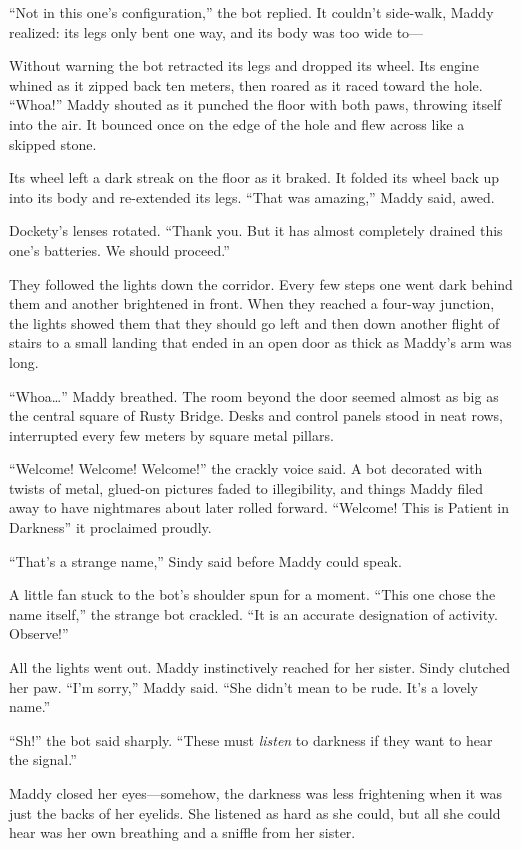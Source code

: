 \documentclass[10pt]{article}
\begin{document}
``Not in this one's configuration,'' the bot replied. It couldn't
side-walk, Maddy realized: its legs only bent one way, and its body was
too wide to---

Without warning the bot retracted its legs and dropped its wheel. Its
engine whined as it zipped back ten meters, then roared as it raced
toward the hole. ``Whoa!'' Maddy shouted as it punched the floor with
both paws, throwing itself into the air. It bounced once on the edge of
the hole and flew across like a skipped stone.

Its wheel left a dark streak on the floor as it braked. It folded its
wheel back up into its body and re-extended its legs. ``That was
amazing,'' Maddy said, awed.

Dockety's lenses rotated. ``Thank you. But it has almost completely
drained this one's batteries. We should proceed.''

They followed the lights down the corridor. Every few steps one went
dark behind them and another brightened in front. When they reached a
four-way junction, the lights showed them that they should go left and
then down another flight of stairs to a small landing that ended in an
open door as thick as Maddy's arm was long.

``Whoa\ldots{}'' Maddy breathed. The room beyond the door seemed almost
as big as the central square of Rusty Bridge. Desks and control panels
stood in neat rows, interrupted every few meters by square metal
pillars.

``Welcome! Welcome! Welcome!'' the crackly voice said. A bot decorated
with twists of metal, glued-on pictures faded to illegibility, and
things Maddy filed away to have nightmares about later rolled forward.
``Welcome! This is Patient in Darkness'' it proclaimed proudly.

``That's a strange name,'' Sindy said before Maddy could speak.

A little fan stuck to the bot's shoulder spun for a moment. ``This one
chose the name itself,'' the strange bot crackled. ``It is an accurate
designation of activity. Observe!''

All the lights went out. Maddy instinctively reached for her sister.
Sindy clutched her paw. ``I'm sorry,'' Maddy said. ``She didn't mean to
be rude. It's a lovely name.''

``Sh!'' the bot said sharply. ``These must \emph{listen} to darkness if
they want to hear the signal.''

Maddy closed her eyes---somehow, the darkness was less frightening when
it was just the backs of her eyelids. She listened as hard as she could,
but all she could hear was her own breathing and a sniffle from her
sister.
\end{document}
